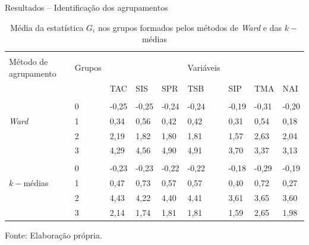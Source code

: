 \documentclass[aspectratio=169]{beamer}
\begin{document}
\begin{frame}{Resultados -- Identificação dos agrupamentos}
    \begin{table}[h]
    \caption{Média da estatística $G_i$ nos grupos formados pelos métodos de \textit{Ward} e das  $k-$médias} \label{mean_G}
    \footnotesize
    \vspace{0.05cm}
    \begin{tabularx}{\textwidth}{LXXXXXXXX}
        \hline \\[-1.9ex]	 
        Método de agrupamento & Grupos & & & & Variáveis \\
        
                              & & TAC   & SIS   & SPR   & TSB   & SIP  & TMA   & NAI   \\
        \hline \\[-1.9ex]	 
                         & 0 & -0,25 & -0,25 & -0,24 & -0,24 & -0,19 & -0,31 & -0,20 \\
        \textit{Ward}    & 1 &  0,34 &  0,56 &  0,42 &  0,42 &  0,31 &  0,54 &  0,18 \\
                         & 2 &  2,19 &  1,82 &  1,80 &  1,81 &  1,57 &  2,63 &  2,04 \\
                         & 3 &  4,29 &  4,56 &  4,90 &  4,91 &  3,70 &  3,37 &  3,13 \\
        \hline \\[-1,9ex]	 
                         & 0 & -0,23 & -0,23 & -0,22 & -0,22 & -0,18 & -0,29 & -0,19 \\
        $k-$médias       & 1 &  0,47 &  0,73 &  0,57 &  0,57 &  0,40 &  0,72 &  0,27 \\
                         & 2 &  4,43 &  4,22 &  4,40 &  4,41 &  3,61 &  3,65 &  3,60 \\
                         & 3 &  2,14 &  1,74 &  1,81 &  1,81 &  1,59 &  2,65 &  1,98 \\
        \hline 
    \end{tabularx} 
\end{table}
\noindent\footnotesize{Fonte: Elaboração própria.  }\\
\end{frame}
\end{document}
